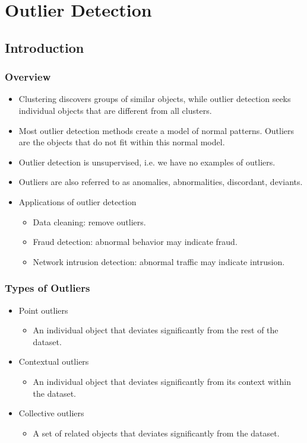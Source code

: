 \documentclass[../notes.tex]{subfiles}
\begin{document}
\section{Outlier Detection}
\subsection{Introduction}
\subsubsection{Overview}
\begin{itemize}
  \item Clustering discovers groups of similar objects, while outlier detection seeks individual objects that are different from all clusters.
  \item Most outlier detection methods create a model of normal patterns. Outliers are the objects that do not fit within this normal model.
  \item Outlier detection is unsupervised, i.e. we have no examples of outliers.
  \item Outliers are also referred to as anomalies, abnormalities, discordant, deviants.
  \item Applications of outlier detection
  \begin{itemize}
    \item Data cleaning: remove outliers.
    \item Fraud detection: abnormal behavior may indicate fraud.
    \item Network intrusion detection: abnormal traffic may indicate intrusion.
  \end{itemize}
\end{itemize}

\subsubsection{Types of Outliers}
\begin{itemize}
  \item Point outliers
  \begin{itemize}
    \item An individual object that deviates significantly from the rest of the dataset.
  \end{itemize}

  \item Contextual outliers
  \begin{itemize}
    \item An individual object that deviates significantly from its context within the dataset.
  \end{itemize}

  \item Collective outliers
  \begin{itemize}
    \item A set of related objects that deviates significantly from the dataset.
  \end{itemize}

\end{itemize}
\end{document}
